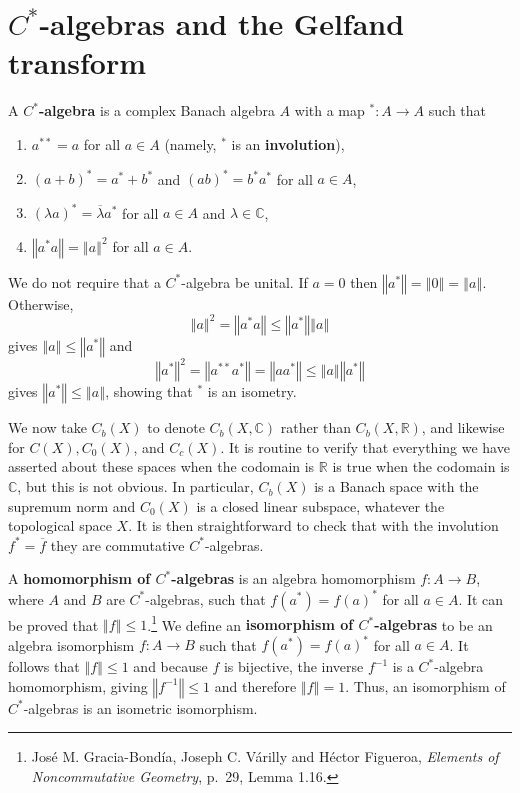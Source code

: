 \documentclass{article}
\newcommand{\norm}[1]{\left\Vert #1 \right\Vert}
\theoremstyle{definition}
\begin{document}
\section{$C^*$-algebras and the Gelfand transform}
A \textbf{$C^*$-algebra} is a complex Banach algebra $A$
with a map $^*:A \to A$ such
that
\begin{enumerate}
\item $a^{**}=a$ for all $a \in A$ (namely, $^*$ is an \textbf{involution}),
\item $(a+b)^*=a^*+b^*$ and $(ab)^*=b^*a^*$ for all $a \in A$,
\item $(\lambda a)^* = \overline{\lambda} a^*$ for all $a \in A$ and $\lambda \in \mathbb{C}$,
\item $\norm{a^*a}=\norm{a}^2$ for all $a \in A$.
\end{enumerate}
We do not require that a $C^*$-algebra be unital. 
If $a=0$ then $\norm{a^*}=\norm{0}=\norm{a}$. 
Otherwise,
\[
\norm{a}^2=\norm{a^*a} \leq \norm{a^*} \norm{a}
\]
gives $\norm{a} \leq \norm{a^*}$ and
\[
\norm{a^*}^2 = \norm{a^{**}a^*} = \norm{aa^*} \leq \norm{a}\norm{a^*}
\]
gives $\norm{a^*} \leq \norm{a}$, showing that $^*$ is an isometry. 



We now take $C_b(X)$ to denote $C_b(X,\mathbb{C})$ rather than $C_b(X,\mathbb{R})$, and likewise for $C(X), C_0(X)$, and $C_c(X)$. 
It is routine   to verify that everything we have asserted about these spaces when the codomain is $\mathbb{R}$ is
true
when the codomain is $\mathbb{C}$, but this is not obvious. In particular, $C_b(X)$ is a Banach space with the supremum norm and $C_0(X)$ is a closed linear subspace, 
whatever the topological space $X$. It is then straightforward to check that with the involution $f^*= \overline{f}$ they
are commutative $C^*$-algebras. 


A \textbf{homomorphism of $C^*$-algebras} is an algebra homomorphism $f:A \to B$, where $A$ and $B$ are $C^*$-algebras, such that
$f(a^*)=f(a)^*$ for all $a \in A$. It can be proved that $\norm{f} \leq 1$.\footnote{Jos\'e M. Gracia-Bond\'ia, Joseph C. V\'arilly and
H\'ector Figueroa, {\em Elements of Noncommutative Geometry}, p.~29, Lemma 1.16.} We define an
\textbf{isomorphism of $C^*$-algebras} to be an algebra isomorphism $f:A \to B$ such that
$f(a^*)=f(a)^*$ for all $a \in A$. It follows that $\norm{f} \leq 1$ and because $f$ is bijective, the inverse $f^{-1}$ is a $C^*$-algebra homomorphism,
giving $\norm{f^{-1}} \leq 1$ and therefore $\norm{f}=1$. Thus, an isomorphism of $C^*$-algebras is an isometric isomorphism.
\end{document}
